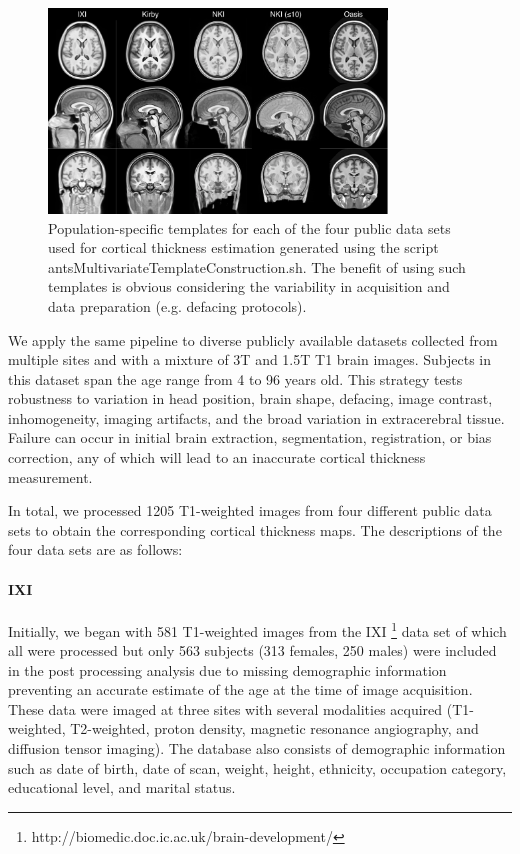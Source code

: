 \begin{figure}
  \centering
  \includegraphics[width=90mm]{Figures/templates.pdf}
  \caption{Population-specific templates for each of the four public data sets used 
  for cortical thickness 
  estimation generated using the script antsMultivariateTemplateConstruction.sh. 
  The benefit of using such templates is obvious considering the variability in
  acquisition and data preparation (e.g. defacing protocols).
  }
  \label{fig:template}
\end{figure}

We apply the same pipeline to diverse publicly available datasets collected
from multiple sites and with a mixture of 3T and
1.5T T1 brain images.  Subjects in this dataset
span the age range from 4 to 96 years old.  This strategy tests robustness to
variation in head position, brain shape, defacing, image contrast, inhomogeneity, imaging
artifacts, and the broad variation in extracerebral tissue.  Failure
can occur in initial brain extraction, segmentation, registration, or
bias correction, any of which will lead to an inaccurate cortical
thickness measurement.                           

In total, we processed 1205 T1-weighted images from four different
public data sets to obtain the corresponding cortical thickness maps.                           
The descriptions of the four data sets are as follows: 
                                          
\paragraph{IXI}
Initially, we began with 581 T1-weighted images from the IXI%
\footnote{
http://biomedic.doc.ic.ac.uk/brain-development/
}
 data set
of which all were processed but only 563 subjects 
(313 females, 250 males) were included in the post processing analysis due to 
missing demographic information preventing an accurate estimate of 
the age at the time of image acquisition.  These data were
imaged at three sites 
with several modalities acquired (T1-weighted, T2-weighted, proton density, magnetic 
resonance angiography, and diffusion tensor imaging).  The 
database also consists of  demographic information such as date of birth, date
of scan, weight,
height, ethnicity, occupation category, educational level, and marital status.

